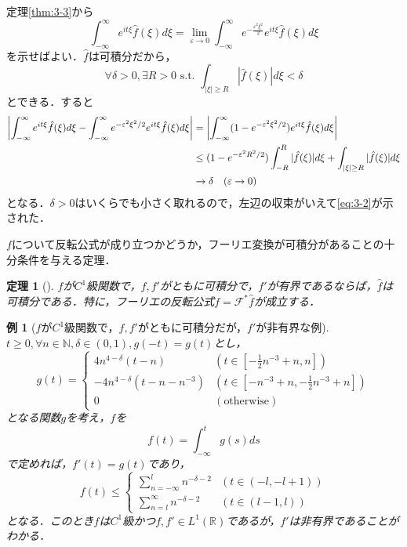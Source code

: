 \documentclass[dvipdfmx,a4j,10pt]{jsarticle}
\makeatletter
\theoremstyle{mystyle1}
\newtheorem{theorem}{定理}[section]
\theoremstyle{mystyle3}
\theoremstyle{mystyle4}
\theoremstyle{mystyle6}
\theoremstyle{mystyle2}
\newtheorem{ex*}{例}
\theoremstyle{mystyle5}
\renewenvironment{proof}[1][\proofname]{\par
  \pushQED{\qed}%
  \normalfont
  \topsep6\p@\@plus6\p@ \trivlist
  \item[\hskip\labelsep{\bfseries\sffamily #1}]\ignorespaces
}{%
  \popQED\endtrivlist\@endpefalse
}
\renewcommand\proofname{証明}
\newenvironment{thm}[1][]
{\begin{tcolorbox}[
    enhanced,
    boxrule=0pt,
    arc=0mm,
    frame hidden,
    borderline west={2pt}{-4pt}{red},
    breakable = true
    ]
    \begin{theorem}[#1]
}
{\end{theorem}\end{tcolorbox}}
\makeatother
\begin{document}
\begin{proof}
	定理\ref{thm:3-3}から
	\begin{equation}\label{eq:3-2}
		\int_{-\infty}^\infty e^{it\xi}\hat f(\xi)d\xi=\lim_{\varepsilon\to 0}\int_{-\infty}^\infty e^{-\frac{\varepsilon^2\xi^2}{2}}e^{it\xi}\hat{f}(\xi)d\xi
	\end{equation}
	を示せばよい．$\hat f$は可積分だから，
	\[
		\forall\delta>0,\exists R>0\,\,\textrm{s.t.}\,\,\int_{|\xi|\geq R}|\hat f(\xi)|	d\xi<\delta
	\]
	とできる．すると
	\[
		\begin{split}
			\mleft|\int_{-\infty}^\infty e^{it\xi}\hat f(\xi)d\xi-\int_{-\infty}^\infty e^{-\varepsilon^2\xi^2/2}e^{it\xi}\hat f(\xi)d\xi\mright|
			&=\mleft|\int_{-\infty}^\infty (1-e^{-\varepsilon^2\xi^2/2})e^{it\xi}\hat f(\xi)d\xi\mright| \\
			&\leq (1-e^{-\varepsilon^2R^2/2})\int_{-R}^R|\hat f(\xi)|d\xi+\int_{|\xi|\geq R}|\hat f(\xi)|d\xi \\
			&\to \delta \quad (\varepsilon\to 0)
		\end{split}
	\]
	となる．$\delta>0$はいくらでも小さく取れるので，左辺の収束がいえて\eqref{eq:3-2}が示された．
\end{proof}

$f$について反転公式が成り立つかどうか，フーリエ変換が可積分があることの十分条件を与える定理．

\begin{thm}\label{thm:3-6}
	$f$が$C^1$級関数で，$f,f'$がともに可積分で，$f'$が有界であるならば，$\hat f$は可積分である．特に，フーリエの反転公式$f=\mathcal{F}^*\hat f$が成立する\footnotemark．
\end{thm}


\begin{ex*}[$f$が$C^1$級関数で，$f,f'$がともに可積分だが，$f'$が非有界な例]
	$t\geq 0,\forall n\in\mathbb{N},\delta\in (0,1),g(-t)=g(t)$とし，
	\[
		g(t)=\begin{cases}
			4n^{4-\delta}(t-n)         & (t\in [-\frac{1}{2}n^{-3}+n,n])         \\
			-4n^{4-\delta}(t-n-n^{-3}) & (t\in [-n^{-3}+n,-\frac{1}{2}n^{-3}+n]) \\
			0                          & (\textrm{otherwise})
		\end{cases}
	\]
	となる関数$g$を考え，$f$を
	\[
		f(t)=\int_{-\infty}^t g(s)ds
	\]
	で定めれば，$f'(t)=g(t)$であり，
	\[
		f(t)\leq\begin{cases}
			\sum_{n=-\infty}^l n^{-\delta-2} & (t\in (-l,-l+1)) \\
			\sum_{n=l}^\infty n^{-\delta-2}  & (t\in (l-1,l))
		\end{cases}
	\]
	となる．このとき$f$は$C^1$級かつ$f,f'\in L^1(\mathbb{R})$であるが，$f'$は非有界であることがわかる．
\end{ex*}
\end{document}
